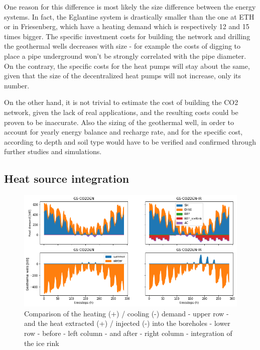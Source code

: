 \documentclass{article}
\begin{document}


One reason for this difference is most likely the size difference between the energy systems. In fact, the Eglantine system is drastically smaller than the one at ETH or in Friesenberg, which have a heating demand which is respectively 12 and 15 times bigger. The specific investment costs for building the network and drilling the geothermal wells decreases with size - for example the costs of digging to place a pipe underground won't be strongly correlated with the pipe diameter. On the contrary, the specific costs for the heat pumps will stay about the same, given that the size of the decentralized heat pumps will not increase, only its number.

On the other hand, it is not trivial to estimate the cost of building the CO2 network, given the lack of real applications, and the resulting costs could be proven to be inaccurate. Also the sizing of the geothermal well, in order to account for yearly energy balance and recharge rate, and for the specific cost, according to depth and soil type would have to be verified and confirmed through further studies and simulations.


\subsection{Heat source integration}

\begin{figure}[thpb]
	\centering
	\includegraphics[width=1\linewidth]{Images/V_IR_Q}
	\caption{Comparison of the heating (+) / cooling (-) demand - upper row - and the heat extracted (+) / injected (-) into the boreholes - lower row - before - left column - and after - right column - integration of the ice rink}
	\label{fig:V_IR_Q}
\end{figure}
\end{document}
